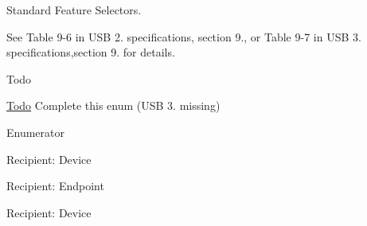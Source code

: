 Standard Feature Selectors. 

See Table 9-\/6 in U\-S\-B 2. specifications, section 9., or Table 9-\/7 in U\-S\-B 3. specifications,section 9. for details.

\begin{DoxyRefDesc}{Todo}
\item[\hyperlink{todo__todo000040}{Todo}]Complete this enum (U\-S\-B 3. missing) \end{DoxyRefDesc}
\begin{Desc}
\item[Enumerator]\par
\begin{description}
\item[{\em 
\hypertarget{classmdt_usb_control_transfer_acae7a9c10825dd7fa7695a16986a2f36aca848daa4edec831a1104579c4090324}{D\-E\-V\-I\-C\-E\-\_\-\-R\-E\-M\-O\-T\-E\-\_\-\-W\-A\-K\-E\-U\-P}\label{classmdt_usb_control_transfer_acae7a9c10825dd7fa7695a16986a2f36aca848daa4edec831a1104579c4090324}
}]Recipient\-: Device \item[{\em 
\hypertarget{classmdt_usb_control_transfer_acae7a9c10825dd7fa7695a16986a2f36a87146aadc04de87777e6158e4488f5aa}{E\-N\-D\-P\-O\-I\-N\-T\-\_\-\-H\-A\-L\-T}\label{classmdt_usb_control_transfer_acae7a9c10825dd7fa7695a16986a2f36a87146aadc04de87777e6158e4488f5aa}
}]Recipient\-: Endpoint \item[{\em 
\hypertarget{classmdt_usb_control_transfer_acae7a9c10825dd7fa7695a16986a2f36a149a70859728a79c49046a6f40087a4f}{T\-E\-S\-T\-\_\-\-M\-O\-D\-E}\label{classmdt_usb_control_transfer_acae7a9c10825dd7fa7695a16986a2f36a149a70859728a79c49046a6f40087a4f}
}]Recipient\-: Device \end{description}
\end{Desc}


